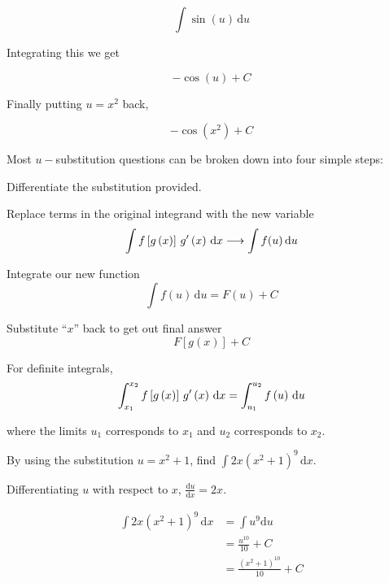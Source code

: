 \documentclass[11pt,a4paper]{book}
\begin{document}
\[
\int\sin(u)\, \mathrm{d}u
\]

Integrating this we get

\[
-\cos(u)+C
\]

Finally putting $u=x^{2}$ back,

\[
-\cos(x^{2})+C
\]


\begin{tcolorbox}[colback=blue!5, colframe=black, boxrule=.4pt, sharpish corners]

Most $u-$substitution questions can be broken down into four simple
steps:

\begin{tasks}[label=(\arabic*),label-width=3.5ex]

\task Differentiate the substitution provided.

\task Replace terms in the original integrand with the new variable
\[
\int f\left[g\left(x\right)\right]\thinspace g'\left(x\right)\,\mathrm{d}x\longrightarrow\int f(u)\, \mathrm{d}u
\]

\task Integrate our new function
\[
\int f\left(u\right)\, \mathrm{d}u=F\left(u\right)+C
\]

\task Substitute ``$x$'' back to get out final answer
\[
F\left[g\left(x\right)\right]+C
\]

\end{tasks}
\end{tcolorbox}

For definite integrals,
\[
\int_{x_{1}}^{x_{2}}f\left[g\left(x\right)\right]\thinspace g'\left(x\right)\,\mathrm{d}x=\int_{u_{1}}^{u_{2}}f\left(u\right)\,\mathrm{d}u
\]

where the limits $u_{1}$ corresponds to $x_{1}$ and $u_{2}$ corresponds
to $x_{2}$.

\newpage{}

\begin{example}

By using the substitution $u=x^{2}+1$, find ${\displaystyle \int2x\left(x^{2}+1\right)^{9}\,\mathrm{d}x}$.

\Solution

Differentiating $u$ with respect to $x$, ${\displaystyle \frac{\mathrm{d}u}{\mathrm{d}x}=2x}$.

\begin{align*}
\int2x\left(x^{2}+1\right)^{9}\,\mathrm{d}x & =\int u^{9}\mathrm{d}u\\
 & =\frac{u^{10}}{10}+C\\
 & =\frac{\left(x^{2}+1\right)^{10}}{10}+C
\end{align*}

\end{example}
\end{document}
